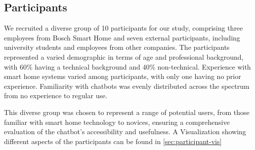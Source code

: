 \subsection{Participants}
We recruited a diverse group of 10 participants for our study, comprising three employees from Bosch Smart Home and seven external participants, including university students and employees from other companies. The participants represented a varied demographic in terms of age and professional background, with 60\% having a technical background and 40\% non-technical. Experience with smart home systems varied among participants, with only one having no prior experience. Familiarity with chatbots was evenly distributed across the spectrum from no experience to regular use.

This diverse group was chosen to represent a range of potential users, from those familiar with smart home technology to novices, ensuring a comprehensive evaluation of the chatbot's accessibility and usefulness. A Visualization showing different aspects of the participants can be found in \cref{sec:participant-vis}

